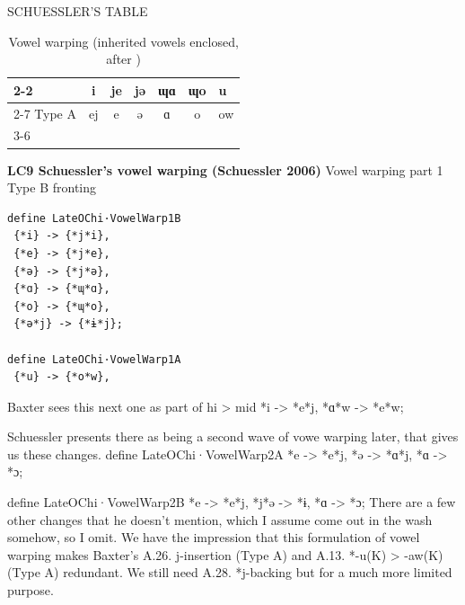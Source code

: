 \documentclass[xetex, svgnames, 12pt]{scrartcl}
\newcounter{para}
\newcommand\mypara[1]{\par\refstepcounter{para}\textbf{\thepara\space#1\space}}
\begin{document}
SCHUESSLER'S TABLE

\begin{table}
\centering
\caption{Vowel warping (inherited vowels enclosed, after \cite[87]{Schuessler2006warping})}
\begin{tabular}{lc|cccc|c} 
\cline{2-2} \cline{7-7}
\multicolumn{1}{l|}{Type B} &  i & je & jə & ɰɑ & ɰo & \multicolumn{1}{l|}{u} \\ 
\cline{2-7}
Type A & ej & e & ə & ɑ & o & ow \\ 
\cline{3-6}
\end{tabular}
\end{table}

\mypara{LC9 Schuessler's vowel warping (Schuessler 2006)}
Vowel warping part 1
 Type B fronting 
 \begin{verbatim}
define LateOChi·VowelWarp1B
 {*i} -> {*j*i},
 {*e} -> {*j*e},
 {*ə} -> {*j*ə},
 {*ɑ} -> {*ɰ*ɑ},
 {*o} -> {*ɰ*o},
 {*ə*j} -> {*ɨ*j};

define LateOChi·VowelWarp1A
 {*u} -> {*o*w},
 \end{verbatim}
 
Baxter sees this next one as part of hi > mid
 {*i} -> {*e*j}, 
 {*ɑ*w} -> {*e*w};

Schuessler presents there as being a second wave of vowe warping later, that gives us these changes. 
define LateOChi·VowelWarp2A
 {*e} -> {*e*j},
 {*ə} -> {*ɑ*j},
 {*ɑ} -> {*ɔ};

define LateOChi·VowelWarp2B
 {*e} -> {*e*j},
 {*j*ə} -> {*ɨ},
 {*ɑ} -> {*ɔ};
 There are a few other changes that he doesn't mention, which I assume come out in the wash somehow, so I omit. 
 We have the impression that this formulation of vowel warping makes Baxter's A.26. j-insertion (Type A) 
 and  A.13. *-u(K) > -aw(K) (Type A) redundant. We still need A.28. *j-backing but for a much more limited
 purpose.
 
\end{document}

